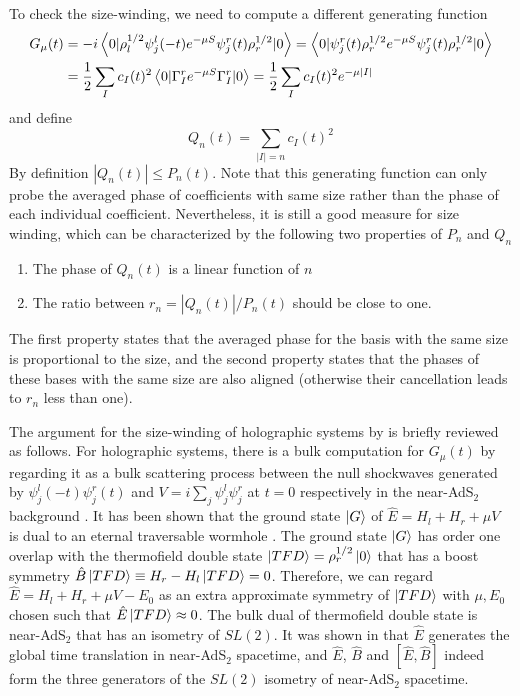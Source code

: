 \documentclass[11pt]{article}
\renewcommand{\>}{\rangle}
\newcommand{\<}{\langle}
\begin{document}
To check the size-winding, we need to compute a different generating
function
\begin{align}
G_{\mu}(t) & =-i\left\langle 0|\rho_{l}^{1/2}\psi_{j}^{l}(-t)e^{-\mu S}\psi_{j}^{r}(t)\rho_{r}^{1/2}|0\right\rangle=\left\langle 0|\psi_{j}^{r}(t)\rho_{r}^{1/2}e^{-\mu S}\psi_{j}^{r}(t)\rho_{r}^{1/2}|0\right\rangle\nonumber \\
 & =\frac{1}{2}\sum_{I}c_{I}(t)^{2}\left\langle 0|\Gamma_{I}^{r}e^{-\mu S}\Gamma_{I}^{r}|0\right\rangle=\frac{1}{2}\sum_{I}c_{I}(t)^{2}e^{-\mu|I|}\label{eq:33-1}
\end{align}
and define
\begin{equation}
Q_{n}(t)=\sum_{|I|=n}c_{I}(t)^{2}\label{eq:55}
\end{equation}
By definition $|Q_{n}(t)|\leq P_{n}(t)$. Note that this generating function can only probe the averaged phase of coefficients with same
size rather than the phase of each individual coefficient. Nevertheless,
it is still a good measure for size winding, which can be characterized
by the following two properties of $P_{n}$ and $Q_{n}$ \cite{Jafferis:2022crx, Kobrin:2023rzr}
\begin{enumerate}
\item The phase of $Q_{n}(t)$ is a linear function of $n$
\item The ratio between $r_{n}=|Q_{n}(t)|/P_{n}(t)$ should be close to
one.
\end{enumerate}
The first property states that the averaged phase for the basis with
the same size is proportional to the size, and the second property states
that the phases of these bases with the same size are also aligned (otherwise
their cancellation leads to $r_{n}$ less than one).

The argument for the size-winding of holographic systems by \cite{Brown:2019hmk, Nezami:2021yaq}
is briefly reviewed as follows. For holographic systems, there is
a bulk computation for $G_{\mu}(t)$ by regarding it as a bulk scattering
process between the null shockwaves generated by $\psi_{j}^{l}(-t)\psi_{j}^{r}(t)$
and $V=i\sum_{j}\psi_{j}^{l}\psi_{j}^{r}$ at $t=0$ respectively
in the near-AdS$_{2}$ background \cite{Maldacena:2017axo}. It has been
shown that the ground state $\left|G\right\rangle$ of $\hat{E}=H_{l}+H_{r}+\mu V$
is dual to an eternal traversable wormhole \cite{Maldacena:2018lmt}. The ground state
$\left|G\right\rangle$ has order one overlap with the thermofield double state
$\left|TFD\right\rangle=\rho_{r}^{1/2}\left|0\right\rangle$ that has a boost symmetry $\hat{B}\left|TFD\right\rangle\equiv H_{r}-H_{l}\left|TFD\right\rangle=0$.
Therefore, we can regard $\hat{E}=H_{l}+H_{r}+\mu V-E_{0}$ as an
extra approximate symmetry of $\left|TFD\right\rangle$ with $\mu,E_{0}$ chosen
such that $\hat{E}\left|TFD\right\rangle\approx0$. The bulk dual of thermofield double
state is near-AdS$_{2}$ that has an isometry of $SL(2)$. It was
shown in \cite{Lin:2019qwu} that $\hat{E}$ generates the global time translation
in near-AdS$_{2}$ spacetime, and $\hat{E}$, $\hat{B}$ and $[\hat{E},\hat{B}]$
indeed form the three generators of the $SL(2)$ isometry of near-AdS$_{2}$
spacetime. 
\end{document}
